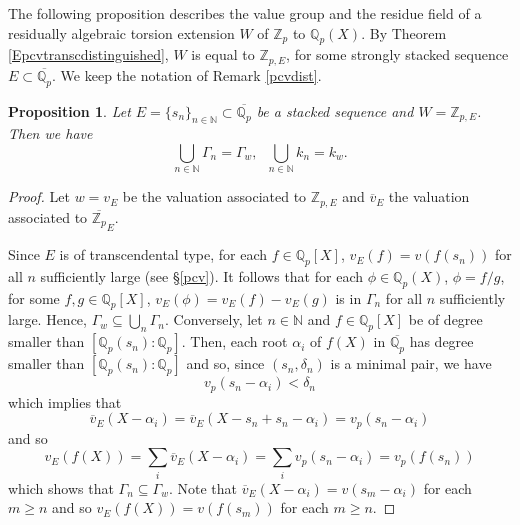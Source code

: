\documentclass[10pt]{article}
\numberwithin{equation}{section}
\newtheorem{Prop}[equation]{Proposition}
\theoremstyle{definition}\newtheorem{Def}[equation]{Definition}
\theoremstyle{definition}\newtheorem{Ques}[equation]{Question}
\newcommand{\Q}{\mathbb{Q}}
\newcommand{\N}{\mathbb{N}}
\newcommand{\Z}{\mathbb{Z}}
\newcommand{\oQp}{\overline{\Q_p}}
\newcommand{\oZp}{\overline{\Z_p}}
\begin{document}
The following proposition describes the value group and the residue field of a residually algebraic torsion extension $W$ of $\Z_p$ to $\Q_p(X)$. By Theorem \ref{Epcvtranscdistinguished}, $W$  is equal to $\Z_{p,E}$, for some strongly stacked sequence $E\subset\oQp$.  We keep the notation of   Remark \ref{pcvdist}.

\begin{Prop}\label{residuevaluerat}
Let $E=\{s_n\}_{n\in\N}\subset\oQp$ be a stacked sequence and $W=\Z_{p,E}$.  
Then we have 
$$\bigcup_{n\in\N} \Gamma_n=\Gamma_w,\;\;\bigcup_{n\in\N} k_n=k_w.$$
\end{Prop}
\begin{proof}
Let  $w=v_E$ be the valuation associated  to $\Z_{p,E}$ and $\overline v_E$ the valuation associated to $\oZp_E$.

Since $E$ is of transcendental type, for each $f\in \Q_p[X]$, $v_E(f)=v(f(s_n))$ for all $n$ sufficiently large (see \S \ref{pcv}). It follows that for each $\phi\in\Q_p(X)$, $\phi=f/g$, for some $f,g\in\Q_p[X]$, $v_E(\phi)=v_E(f)-v_E(g)$ is in $\Gamma_n$ for all $n$ sufficiently large. Hence, $\Gamma_w\subseteq \bigcup_n \Gamma_n$. Conversely, let $n\in\N$ and $f\in\Q_p[X]$ be of degree smaller than $[\Q_p(s_n):\Q_p]$. Then, each root $\alpha_i$ of $f(X)$ in $\oQp$ has degree  smaller than $[\Q_p(s_n):\Q_p]$ and so, since $(s_n,\delta_n)$ is a minimal pair, we have
\begin{equation}\label{smaller degree smaller value}
v_p(s_n-\alpha_i)<\delta_n
\end{equation}
which implies that
\begin{equation}\label{vEX-alpha}
\overline v_E(X-\alpha_i)=\overline v_E(X-s_n+s_n-\alpha_i)=v_p(s_n-\alpha_i)
\end{equation}
and so
\begin{equation}\label{vEfvfsn}
v_E(f(X))=\sum_i \overline v_E(X-\alpha_i)=\sum_i v_p(s_n-\alpha_i)=v_p(f(s_n))
\end{equation} 
which shows that $\Gamma_n\subseteq \Gamma_w$. Note that $\overline v_E(X-\alpha_i)=v(s_m-\alpha_i)$ for each $m\geq n$ and so $v_E(f(X))=v(f(s_m))$ for each $m\geq n$.


\end{proof}
\end{document}
